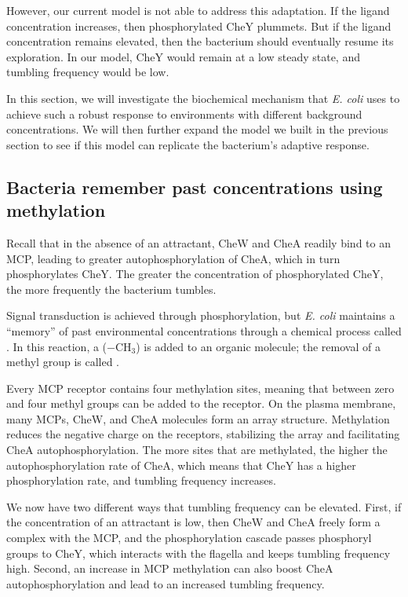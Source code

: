 However, our current model is not able to address this adaptation. If the ligand concentration increases, then phosphorylated CheY plummets. But if the ligand concentration remains elevated, then the bacterium should eventually resume its exploration. In our model, CheY would remain at a low steady state, and tumbling frequency would be low.

In this section, we will investigate the biochemical mechanism that \textit{E. coli} uses to achieve such a robust response to environments with different background concentrations. We will then further expand the model we built in the previous section to see if this model can replicate the bacterium's adaptive response.

\FloatBarrier
{}
\subsection{Bacteria remember past concentrations using methylation}

Recall that in the absence of an attractant, CheW and CheA readily bind to an MCP, leading to greater autophosphorylation of CheA, which in turn phosphorylates CheY. The greater the concentration of phosphorylated CheY, the more frequently the bacterium tumbles.

Signal transduction is achieved through phosphorylation, but \textit{E. coli} maintains a ``memory'' of past environmental concentrations through a chemical process called . In this reaction, a  ($-\text{CH}_3$) is added to an organic molecule; the removal of a methyl group is called .

Every MCP receptor contains four methylation sites, meaning that between zero and four methyl groups can be added to the receptor. On the plasma membrane, many MCPs, CheW, and CheA molecules form an array structure. Methylation reduces the negative charge on the receptors, stabilizing the array and facilitating CheA autophosphorylation. The more sites that are methylated, the higher the autophosphorylation rate of CheA, which means that CheY has a higher phosphorylation rate, and tumbling frequency increases.

We now have two different ways that tumbling frequency can be elevated. First, if the concentration of an attractant is low, then CheW and CheA freely form a complex with the MCP, and the phosphorylation cascade passes phosphoryl groups to CheY, which interacts with the flagella and keeps tumbling frequency high. Second, an increase in MCP methylation can also boost CheA autophosphorylation and lead to an increased tumbling frequency.

